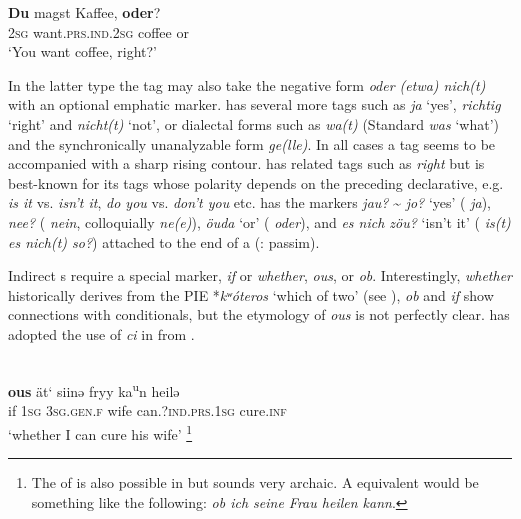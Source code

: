     \ex
    \gll \textbf{{Du}} magst      Kaffee, \textbf{{oder}}?\\
    2\textsc{sg}  want.\textsc{prs}.\textsc{ind}.2\textsc{sg}  coffee  or\\
    \glt ‘You want coffee, right?’
    \z
    \z

\noindent In the latter type the tag may also take the negative form \textit{oder (etwa) nich(t)} with an optional emphatic marker.  has several more tags such as \textit{ja} ‘yes’, \textit{richtig} ‘right’ and \textit{nicht(t)} ‘not’, or dialectal forms such as \textit{wa(t)} (Standard  \textit{was} ‘what’) and the synchronically unanalyzable form \textit{ge(lle)}. In all cases a tag seems to be accompanied with a sharp rising  contour.  has related tags such as \textit{right} but is best-known for its tags whose polarity depends on the preceding declarative, e.g. \textit{is it} vs. \textit{isn’t it}, \textit{do you} vs. \textit{don’t you} etc.  has the  markers \textit{jau?} {\textasciitilde} \textit{jo?} ‘yes’ ( \textit{ja}), \textit{nee?} ( \textit{nein}, colloquially \textit{ne(e)}), \textit{öuda} ‘or’ ( \textit{oder}), and \textit{es nich zöu?} ‘isn’t it’ ( \textit{is(t) es nich(t) so?}) attached to the end of a  (\citealt{Nieuweboer1999}: passim).

Indirect s require a special marker,  \textit{if} or \textit{whether},  \textit{ous}, or  \textit{ob}. Interestingly,  \textit{whether} historically derives from the PIE  *\textit{kʷ}\textit{óteros} ‘which of two’ (see ),  \textit{ob} and  \textit{if} show connections with conditionals, but the etymology of  \textit{ous} is not perfectly clear.  has adopted the use of \textit{ci} in  from .

\ea%
    \label{ex:indo:13}
    \\
    \gll \textbf{{ous}} ät‘  siinə    fryy  ka\textsuperscript{u}n      heilə\\
    if  1\textsc{sg}  3\textsc{sg}.\textsc{gen}.\textsc{f}  wife  can.?\textsc{ind}.\textsc{prs.}1\textsc{sg}  cure.\textsc{inf}\\
    \glt ‘whether I can cure his wife’ \citep[170]{Jedig2014}\footnote{The  of  is also possible in  but sounds very archaic. A  equivalent would be something like the following: \textit{ob ich seine Frau heilen kann}.}
    \z

